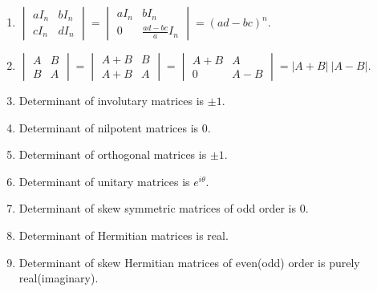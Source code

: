 \begin{enumerate}
	\item $\begin{vmatrix} aI_n & bI_n \\ cI_n & dI_n \end{vmatrix} = \begin{vmatrix} aI_n & bI_n \\ 0 & \frac{ad-bc}{a}I_n \end{vmatrix} = (ad-bc)^n$.
		\item $\begin{vmatrix} A & B \\ B & A \end{vmatrix} = \begin{vmatrix} A+B & B \\ A+B & A \end{vmatrix} = \begin{vmatrix} A+B & A \\ 0 & A-B \end{vmatrix} = |A+B|\ |A-B|$.
	\item Determinant of involutary matrices is $\pm 1$.
	\item Determinant of nilpotent matrices is $0$.
	\item Determinant of orthogonal matrices is $\pm 1$.
	\item Determinant of unitary matrices is $e^{i\theta}$.
	\item Determinant of skew symmetric matrices of odd order is $0$.
	\item Determinant of Hermitian matrices is real.
	\item Determinant of skew Hermitian matrices of even(odd) order is purely real(imaginary).
\end{enumerate}

